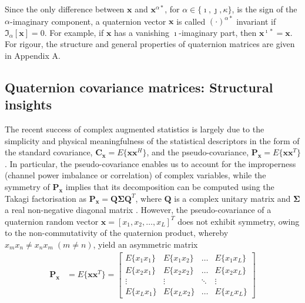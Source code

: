 \documentclass[review]{elsarticle}
\theoremstyle{plain}
\theoremstyle{remark}
\theoremstyle{plain}
\theoremstyle{definition}
\theoremstyle{prop}
\theoremstyle{definition}
\theoremstyle{plain}
\theoremstyle{plain}
\begin{document}
Since the only difference between $\mathbf{x}$ and $\mathbf{x}^{\alpha*}$, for $\alpha\in\{\imath,\jmath,\kappa\}$, is the sign of the $\alpha$-imaginary component, a quaternion vector $\mathbf{x}$ is called $(\cdot)^{\alpha*}$ invariant if $\mathfrak{I}_\alpha[\mathbf{x}]=0$. For example, if $\mathbf{x}$ has a vanishing $\imath$-imaginary part, then $\mathbf{x}^{\imath *}=\mathbf{x}$.
For rigour, the structure and general properties of quaternion matrices are given in Appendix A.
\subsection{Quaternion covariance matrices: Structural insights}
The recent success of complex augmented statistics is largely due to the simplicity and physical meaningfulness of the statistical descriptors in the form of the standard covariance, $\mathbf{C}_\mathbf{x}=E\{\mathbf{xx}^H\}$, and the pseudo-covariance, $\mathbf{P}_\mathbf{x}=E\{\mathbf{xx}^T\}$. In particular, the pseudo-covariance enables us to account for the improperness (channel power imbalance or correlation) of complex variables, while the symmetry of $\mathbf{P}_\mathbf{x}$ implies that its decomposition can be computed using the Takagi factorisation as $\mathbf{P}_\mathbf{x}=\mathbf{Q}\boldsymbol{\Sigma}\mathbf{Q}^T$, where $\mathbf{Q}$ is a complex unitary matrix and $\boldsymbol{\Sigma}$ a real non-negative diagonal matrix \cite{horn1990matrix}. However, the pseudo-covariance of a quaternion random vector $\mathbf{x}=[x_1,x_2,\ldots,x_L]^T$ does not exhibit symmetry, owing to the non-commutativity of the quaternion product, whereby $x_mx_n \neq x_nx_m\;(m\neq n)$, yield an asymmetric matrix
\begin{equation}
\begin{split}
\!\mathbf{P}_{\mathbf{x}}\!&\!=\!E\{\mathbf{xx}^{T}\}\!\!=\!\!\begin{bmatrix}
{E\{x_1x_1\}} & {E\{x_1x_2\}} & \ldots & {E\{x_1x_L\}}\\
{E\{x_2x_1\}} & {E\{x_2x_2\}} & \ldots & {E\{x_2x_L\}}\\
\vdots & \vdots & \ddots & \vdots  \\
{E\{x_Lx_1\}} & {E\{x_Lx_2\}} & \ldots & {E\{x_Lx_L\}}
\end{bmatrix}
\end{split}
\end{equation}
\end{document}
